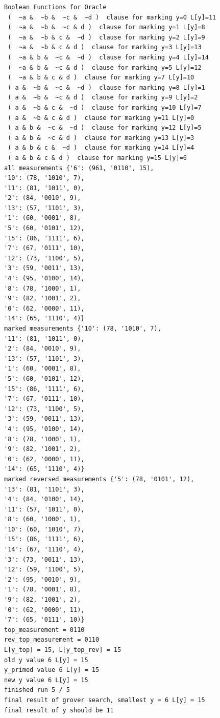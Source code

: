 \documentclass[11pt]{article}
\begin{document}
\begin{verbatim}
Boolean Functions for Oracle
 (  ~a &  ~b &  ~c &  ~d )  clause for marking y=0 L[y]=11
 (  ~a &  ~b &  ~c & d )  clause for marking y=1 L[y]=8
 (  ~a &  ~b & c &  ~d )  clause for marking y=2 L[y]=9
 (  ~a &  ~b & c & d )  clause for marking y=3 L[y]=13
 (  ~a & b &  ~c &  ~d )  clause for marking y=4 L[y]=14
 (  ~a & b &  ~c & d )  clause for marking y=5 L[y]=12
 (  ~a & b & c & d )  clause for marking y=7 L[y]=10
 ( a &  ~b &  ~c &  ~d )  clause for marking y=8 L[y]=1
 ( a &  ~b &  ~c & d )  clause for marking y=9 L[y]=2
 ( a &  ~b & c &  ~d )  clause for marking y=10 L[y]=7
 ( a &  ~b & c & d )  clause for marking y=11 L[y]=0
 ( a & b &  ~c &  ~d )  clause for marking y=12 L[y]=5
 ( a & b &  ~c & d )  clause for marking y=13 L[y]=3
 ( a & b & c &  ~d )  clause for marking y=14 L[y]=4
 ( a & b & c & d )  clause for marking y=15 L[y]=6
all measurements {'6': (961, '0110', 15),
'10': (78, '1010', 7),
'11': (81, '1011', 0),
'2': (84, '0010', 9),
'13': (57, '1101', 3),
'1': (60, '0001', 8),
'5': (60, '0101', 12),
'15': (86, '1111', 6),
'7': (67, '0111', 10),
'12': (73, '1100', 5),
'3': (59, '0011', 13),
'4': (95, '0100', 14),
'8': (78, '1000', 1),
'9': (82, '1001', 2),
'0': (62, '0000', 11),
'14': (65, '1110', 4)}
marked measurements {'10': (78, '1010', 7),
'11': (81, '1011', 0),
'2': (84, '0010', 9),
'13': (57, '1101', 3),
'1': (60, '0001', 8),
'5': (60, '0101', 12),
'15': (86, '1111', 6),
'7': (67, '0111', 10),
'12': (73, '1100', 5),
'3': (59, '0011', 13),
'4': (95, '0100', 14),
'8': (78, '1000', 1),
'9': (82, '1001', 2),
'0': (62, '0000', 11),
'14': (65, '1110', 4)}
marked reversed measurements {'5': (78, '0101', 12),
'13': (81, '1101', 3),
'4': (84, '0100', 14),
'11': (57, '1011', 0),
'8': (60, '1000', 1),
'10': (60, '1010', 7),
'15': (86, '1111', 6),
'14': (67, '1110', 4),
'3': (73, '0011', 13),
'12': (59, '1100', 5),
'2': (95, '0010', 9),
'1': (78, '0001', 8),
'9': (82, '1001', 2),
'0': (62, '0000', 11),
'7': (65, '0111', 10)}
top_measurement = 0110
rev_top_measurement = 0110
L[y_top] = 15, L[y_top_rev] = 15
old y value 6 L[y] = 15
y_primed value 6 L[y] = 15
new y value 6 L[y] = 15
finished run 5 / 5
final result of grover search, smallest y = 6 L[y] = 15
final result of y should be 11


\end{verbatim}
\end{document}
